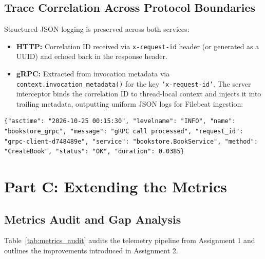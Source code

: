 \documentclass[11pt,a4paper]{article}
\begin{document}
\subsection{Trace Correlation Across Protocol Boundaries}
Structured JSON logging is preserved across both services:
\begin{itemize}\setlength{\itemsep}{0pt}
    \item \textbf{HTTP:} Correlation ID received via \texttt{x-request-id} header (or generated as a UUID) and echoed back in the response header.
    \item \textbf{gRPC:} Extracted from invocation metadata via \texttt{context.invocation\_metadata()} for the key \texttt{'x-request-id'}. The server interceptor binds the correlation ID to thread-local context and injects it into trailing metadata, outputting uniform JSON logs for Filebeat ingestion:
\end{itemize}
\begin{lstlisting}[basicstyle=\ttfamily\scriptsize]
{"asctime": "2026-10-25 00:15:30", "levelname": "INFO", "name": "bookstore_grpc", "message": "gRPC call processed", "request_id": "grpc-client-d748489e", "service": "bookstore.BookService", "method": "CreateBook", "status": "OK", "duration": 0.0385}
\end{lstlisting}

\section{Part C: Extending the Metrics}

\subsection{Metrics Audit and Gap Analysis}
Table~\ref{tab:metrics_audit} audits the telemetry pipeline from Assignment 1 and outlines the improvements introduced in Assignment 2.
\end{document}
